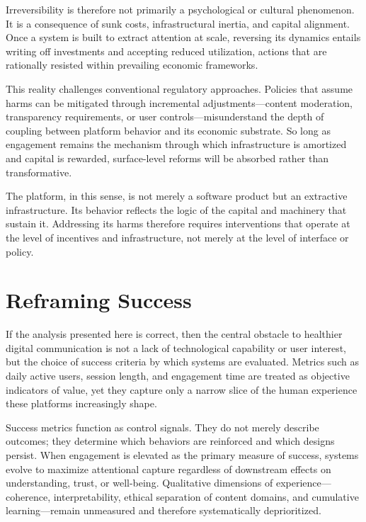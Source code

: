 \documentclass[12pt]{article}
\begin{document}
Irreversibility is therefore not primarily a psychological or cultural phenomenon. It is a consequence of sunk costs, infrastructural inertia, and capital alignment. Once a system is built to extract attention at scale, reversing its dynamics entails writing off investments and accepting reduced utilization, actions that are rationally resisted within prevailing economic frameworks.

This reality challenges conventional regulatory approaches. Policies that assume harms can be mitigated through incremental adjustments—content moderation, transparency requirements, or user controls—misunderstand the depth of coupling between platform behavior and its economic substrate. So long as engagement remains the mechanism through which infrastructure is amortized and capital is rewarded, surface-level reforms will be absorbed rather than transformative.

The platform, in this sense, is not merely a software product but an extractive infrastructure. Its behavior reflects the logic of the capital and machinery that sustain it. Addressing its harms therefore requires interventions that operate at the level of incentives and infrastructure, not merely at the level of interface or policy.

\section{Reframing Success}

If the analysis presented here is correct, then the central obstacle to healthier digital communication is not a lack of technological capability or user interest, but the choice of success criteria by which systems are evaluated. Metrics such as daily active users, session length, and engagement time are treated as objective indicators of value, yet they capture only a narrow slice of the human experience these platforms increasingly shape.

Success metrics function as control signals. They do not merely describe outcomes; they determine which behaviors are reinforced and which designs persist. When engagement is elevated as the primary measure of success, systems evolve to maximize attentional capture regardless of downstream effects on understanding, trust, or well-being. Qualitative dimensions of experience—coherence, interpretability, ethical separation of content domains, and cumulative learning—remain unmeasured and therefore systematically deprioritized.
\end{document}
